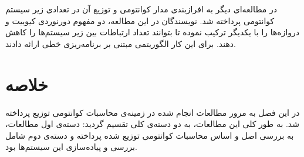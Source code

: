 


در مطالعه‌ای دیگر \cite{nikahd2021automated}
به افرازبندی مدار کوانتومی و توزیع آن در تعدادی زیر سیستم کوانتومی پرداخته شد. نویسندگان در این مطالعه، دو مفهوم دورنوردی کیوبیت و دروازه‌ها را با یکدیگر ترکیب نموده تا بتوانند تعداد ارتباطات بین زیر سیستم‌ها را کاهش دهند. برای این کار الگوریتمی مبتنی بر برنامه‌ریزی خطی ارائه دادند. 
\section{خلاصه}

در این فصل به مرور مطالعات انجام شده در زمینه‌ی محاسبات کوانتومی توزیع پرداخته شد. به طور کلی این مطالعات، به دو دسته‌ی کلی تقسیم گردید: دسته‌ی اول مطالعات، به بررسی اصل و اساس محاسبات کوانتومی توزیع شده پرداخته و  دسته‌ی دوم شامل بررسی و پیاده‌سازی این سیستم‌ها بود.